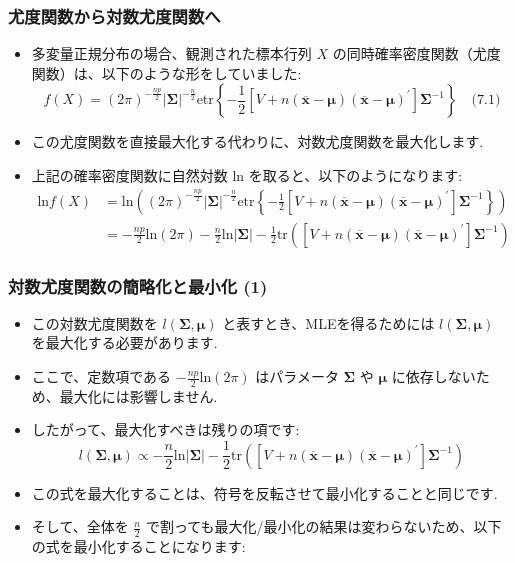\documentclass[aspectratio=169]{beamer}
\begin{document}
\begin{frame}
\frametitle{尤度関数から対数尤度関数へ}
\begin{itemize}
    \item 多変量正規分布の場合、観測された標本行列 $X$ の同時確率密度関数（尤度関数）は、以下のような形をしていました:
    \[
    f(X)=(2\pi)^{-\frac{np}{2}}|\bm{\Sigma}|^{-\frac{n}{2}}\text{etr}\left\{-\frac{1}{2}[V+n(\overline{\bm{x}}-\bm{\mu})(\overline{\bm{x}}-\bm{\mu})^{\prime}]\bm{\Sigma}^{-1}\right\} \quad \text{(7.1)} \text{}
    \]
    \item この尤度関数を直接最大化する代わりに、対数尤度関数を最大化します.
    \item 上記の確率密度関数に自然対数 $\text{ln}$ を取ると、以下のようになります:
    \begin{align*}
    \text{ln}f(X)&=\text{ln}\left((2\pi)^{-\frac{np}{2}}|\bm{\Sigma}|^{-\frac{n}{2}}\text{etr}\left\{-\frac{1}{2}[V+n(\overline{\bm{x}}-\bm{\mu})(\overline{\bm{x}}-\bm{\mu})^{\prime}]\bm{\Sigma}^{-1}\right\}\right) \text{} \\
    &=-\frac{np}{2}\text{ln}(2\pi)-\frac{n}{2}\text{ln}|\bm{\Sigma}|-\frac{1}{2}\text{tr}\left([V+n(\overline{\bm{x}}-\bm{\mu})(\overline{\bm{x}}-\bm{\mu})^{\prime}]\bm{\Sigma}^{-1}\right) \text{}
    \end{align*}
\end{itemize}
\end{frame}

\begin{frame}
\frametitle{対数尤度関数の簡略化と最小化 (1)}
\begin{itemize}
    \item この対数尤度関数を $l(\bm{\Sigma},\bm{\mu})$ と表すとき、MLEを得るためには $l(\bm{\Sigma},\bm{\mu})$ を最大化する必要があります.
    \item ここで、定数項である $-\frac{np}{2}\text{ln}(2\pi)$ はパラメータ $\bm{\Sigma}$ や $\bm{\mu}$ に依存しないため、最大化には影響しません.
    \item したがって、最大化すべきは残りの項です:
    \[
    l(\bm{\Sigma},\bm{\mu})\propto-\frac{n}{2}\text{ln}|\bm{\Sigma}|-\frac{1}{2}\text{tr}\left([V+n(\overline{\bm{x}}-\bm{\mu})(\overline{\bm{x}}-\bm{\mu})^{\prime}]\bm{\Sigma}^{-1}\right)
    \]
    \item この式を最大化することは、符号を反転させて最小化することと同じです.
    \item そして、全体を $\frac{n}{2}$ で割っても最大化/最小化の結果は変わらないため、以下の式を最小化することになります:
\end{itemize}
\end{frame}
\end{document}

